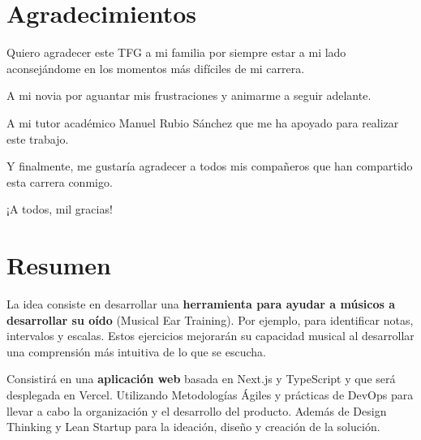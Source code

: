 \documentclass[12pt,twoside,titlepage]{report}
\newcommand\blankpage{%
    \newpage
    \null
    \thispagestyle{empty}%
    \newpage}
\begin{document}
\hypersetup{pageanchor=true}
\normalsize
\afterpage{\blankpage}
 
\setlength{\parskip}{0.75em}
\renewcommand{\baselinestretch}{1.25}

\setcounter{page}{2}


 

\chapter*{Agradecimientos}

Quiero agradecer este TFG a mi familia por siempre estar a mi lado aconsejándome en los momentos más difíciles de mi carrera. 

A mi novia por aguantar mis frustraciones y animarme a seguir adelante. 

A mi tutor académico Manuel Rubio Sánchez que me ha apoyado para realizar este trabajo. 

Y finalmente, me gustaría agradecer a todos mis compañeros que han compartido esta carrera conmigo.

¡A todos, mil gracias!
\afterpage{\blankpage}


 

\chapter*{Resumen}
La idea consiste en desarrollar una \textbf{herramienta para ayudar a músicos a desarrollar su oído} (Musical Ear Training). Por ejemplo, para identificar notas, intervalos y escalas. Estos ejercicios mejorarán su capacidad musical al desarrollar una comprensión más intuitiva de lo que se escucha.

Consistirá en una \textbf{aplicación web} basada en Next.js y TypeScript y que será desplegada en Vercel. Utilizando Metodologías Ágiles y prácticas de DevOps para llevar a cabo la organización y el desarrollo del producto. Además de Design Thinking y Lean Startup para la ideación, diseño y creación de la solución.
\end{document}
